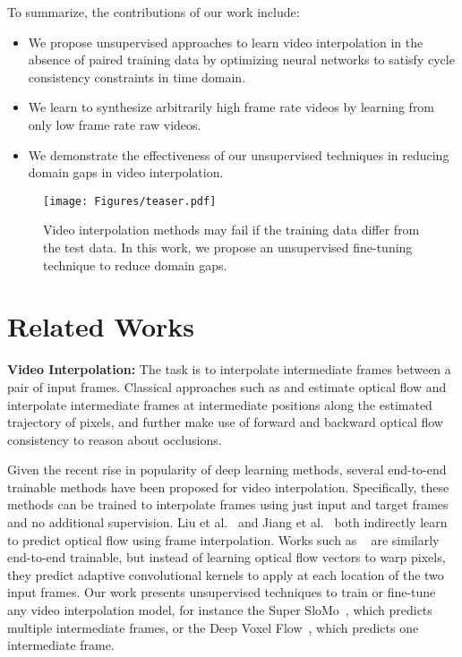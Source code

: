 \documentclass[10pt,twocolumn,letterpaper]{article}
\begin{document}
To summarize, the contributions of our work include:
\begin{itemize}[topsep=0pt,noitemsep]
    \item We propose unsupervised approaches to learn video interpolation in the absence of paired training data by optimizing neural networks to satisfy cycle consistency constraints in time domain.
    
    \item We learn to synthesize arbitrarily high frame rate videos by learning from only low frame rate raw videos.
    
    \item We demonstrate the effectiveness of our unsupervised techniques in reducing domain gaps in video interpolation.




\end{itemize}
\begin{figure}[t]
\centering
\texttt{[image: Figures/teaser.pdf]}
\caption{Video interpolation methods may fail if the training data differ from the test data. In this work, we propose an unsupervised fine-tuning technique to reduce domain gaps.}
\label{fig:teaser}
\end{figure} 


\section{Related Works}

\noindent\textbf{Video Interpolation:} The task is to interpolate intermediate frames between a pair of input frames. Classical approaches such as \cite{herbst2009occlusion} and \cite{mahajan2009moving} estimate optical flow and interpolate intermediate frames at intermediate positions along the estimated trajectory of pixels, and further make use of forward and backward optical flow consistency to reason about occlusions. 

Given the recent rise in popularity of deep learning methods, several end-to-end trainable methods have been proposed for video interpolation. Specifically, these methods can be trained to interpolate frames using just input and target frames and no additional supervision. Liu et al.~\cite{liu2017video} and Jiang  et al.~\cite{jiang2018super} both indirectly learn to predict optical flow using frame interpolation. Works such as ~\cite{Niklaus_2017_CVPR,Niklaus_2017_ICCV} are similarly end-to-end trainable, but instead of learning optical flow vectors to warp pixels, they predict adaptive convolutional kernels to apply at each location of the two input frames. Our work presents unsupervised techniques to train or fine-tune any video interpolation model, for instance the Super SloMo~\cite{jiang2018super}, which predicts multiple intermediate frames, or the Deep Voxel Flow~\cite{liu2017video}, which predicts one intermediate frame. 
\end{document}
